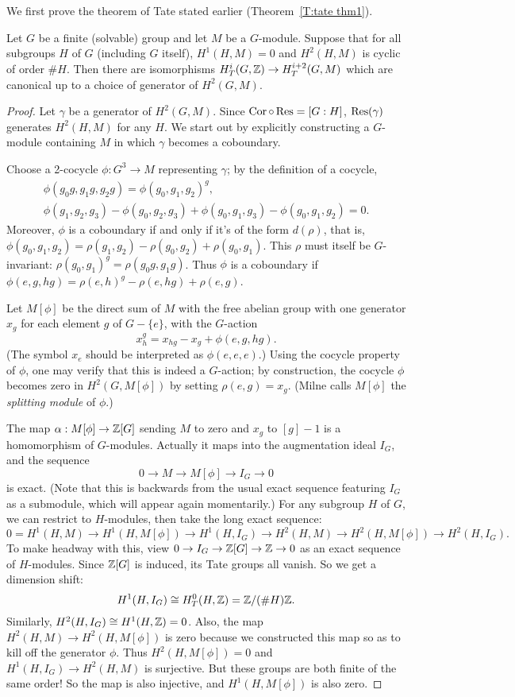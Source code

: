 We first prove the theorem of Tate stated earlier (Theorem~\ref{T:tate thm1}).
\begin{theorem}[Tate] \label{T:tate thm2}
Let $G$ be a finite (solvable) group and let $M$ be a $G$-module. Suppose
that for all subgroups $H$ of $G$ (including $G$ itself), $H^1(H,M)=0$
and $H^2(H,M)$ is cyclic of order $\#H$.
Then there are isomorphisms
$H^i_T(G, \mathbb{Z}) \to H^{i+2}_T(G, M)$ which are canonical up to a choice of
generator of $H^2(G, M)$.
\end{theorem}
\begin{proof}
Let $\gamma$ be a generator of $H^2(G, M)$. Since $\operatorname{Cor} \circ \operatorname{Res}
= [G:H]$, $\operatorname{Res}(\gamma)$ generates $H^2(H,M)$ for any $H$. We start
out by explicitly constructing a $G$-module containing $M$ in which
$\gamma$ becomes a coboundary.

Choose a 2-cocycle $\phi: G^3 \to M$ representing $\gamma$; by the definition
of a cocycle, 
\begin{gather*}
\phi(g_0 g, g_1 g, g_2 g) = \phi(g_0, g_1, g_2)^g, \\
\phi(g_1, g_2, g_3) - \phi(g_0, g_2, g_3) + \phi(g_0, g_1, g_3)
- \phi(g_0, g_1, g_2) = 0.
\end{gather*}
Moreover, $\phi$ is a coboundary if and only if it's of the form
$d(\rho)$, that is, $\phi(g_0, g_1, g_2) = \rho(g_1, g_2) -
\rho(g_0, g_2) + \rho(g_0, g_1)$. This $\rho$ must itself be $G$-invariant:
$\rho(g_0, g_1)^g = \rho(g_0g, g_1g)$. Thus $\phi$ is a coboundary if
$\phi(e, g, hg) = \rho(e,h)^g - \rho(e,hg) + \rho(e,g)$.

Let $M[\phi]$ be the direct sum of $M$ with the free abelian group
with one generator $x_g$ for each element $g$
of $G - \{e\}$, with the $G$-action
\[
x_h^g = x_{hg} - x_g + \phi(e, g, hg).
\]
(The symbol $x_e$ should be interpreted as $\phi(e,e,e)$.)
Using the cocycle property of $\phi$,
one may verify that this is indeed a $G$-action; by construction,
the cocycle $\phi$ becomes zero in $H^2(G, M[\phi])$ by setting
$\rho(e,g) = x_g$. (Milne calls $M[\phi]$ the \emph{splitting module} of
$\phi$.)

The map $\alpha: M[\phi] \to \mathbb{Z}[G]$ sending $M$ to zero and $x_g$
to $[g]-1$ is a homomorphism of $G$-modules. Actually it maps into the
augmentation ideal $I_G$, and the sequence
\[
0 \to M \to M[\phi] \to I_G \to 0
\]
is exact. (Note that this is backwards from the usual exact sequence featuring $I_G$ as a submodule, which will appear again momentarily.)
For any subgroup $H$ of $G$, we can restrict to $H$-modules, then
take the long exact sequence:
\[
0 = H^1(H,M) \to H^1(H, M[\phi]) \to H^1(H, I_G)
\to H^2(H, M) \to H^2(H, M[\phi]) \to H^2(H, I_G).
\]
To make headway with this, view $0 \to I_G \to \mathbb{Z}[G] \to \mathbb{Z} \to 0$
as an exact sequence of $H$-modules. 
 Since $\mathbb{Z}[G]$ is induced, its Tate
groups all vanish. So we get a dimension shift:
\[
H^1(H, I_G) \cong H^0_T(H, \mathbb{Z}) = \mathbb{Z}/(\#H)\mathbb{Z}.
\]
Similarly, $H^2(H, I_G) \cong H^1(H, \mathbb{Z}) = 0$.
Also, the map $H^2(H, M) \to H^2(H, M[\phi])$ is zero because
we constructed this map so as to kill off the generator $\phi$. 
Thus $H^2(H, M[\phi]) = 0$ and $H^1(H, I_G) \to H^2(H,M)$ is surjective. But these groups are both finite
of the same order! So the map is also injective, and $H^1(H, M[\phi])$
is also zero.


\end{proof}
